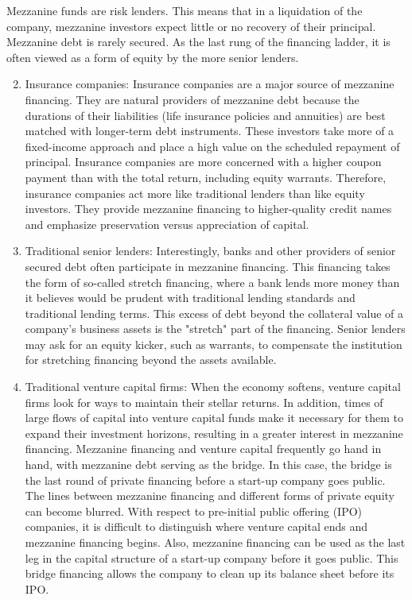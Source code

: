 \documentclass[11pt]{article}
\begin{document}
Mezzanine funds are risk lenders. This means that in a liquidation of the company, mezzanine investors expect little or no recovery of their principal. Mezzanine debt is rarely secured. As the last rung of the financing ladder, it is often viewed as a form of equity by the more senior lenders.

\begin{enumerate}
  \setcounter{enumi}{1}
  \item Insurance companies: Insurance companies are a major source of mezzanine financing. They are natural providers of mezzanine debt because the durations of their liabilities (life insurance policies and annuities) are best matched with longer-term debt instruments. These investors take more of a fixed-income approach and place a high value on the scheduled repayment of principal. Insurance companies are more concerned with a higher coupon payment than with the total return, including equity warrants. Therefore, insurance companies act more like traditional lenders than like equity investors. They provide mezzanine financing to higher-quality credit names and emphasize preservation versus appreciation of capital.

  \item Traditional senior lenders: Interestingly, banks and other providers of senior secured debt often participate in mezzanine financing. This financing takes the form of so-called stretch financing, where a bank lends more money than it believes would be prudent with traditional lending standards and traditional lending terms. This excess of debt beyond the collateral value of a company's business assets is the "stretch" part of the financing. Senior lenders may ask for an equity kicker, such as warrants, to compensate the institution for stretching financing beyond the assets available.

  \item Traditional venture capital firms: When the economy softens, venture capital firms look for ways to maintain their stellar returns. In addition, times of large flows of capital into venture capital funds make it necessary for them to expand their investment horizons, resulting in a greater interest in mezzanine financing. Mezzanine financing and venture capital frequently go hand in hand, with mezzanine debt serving as the bridge. In this case, the bridge is the last round of private financing before a start-up company goes public. The lines between mezzanine financing and different forms of private equity can become blurred. With respect to pre-initial public offering (IPO) companies, it is difficult to distinguish where venture capital ends and mezzanine financing begins. Also, mezzanine financing can be used as the last leg in the capital structure of a start-up company before it goes public. This bridge financing allows the company to clean up its balance sheet before its IPO.

\end{enumerate}
\end{document}
